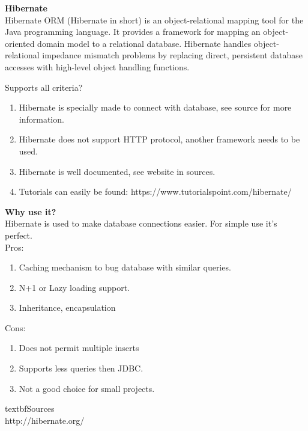 		\textbf{Hibernate} \\
		Hibernate ORM (Hibernate in short) is an object-relational mapping tool for the Java programming language. It provides a framework for mapping an object-oriented domain model to a relational database. Hibernate handles object-relational impedance mismatch problems by replacing direct, persistent database accesses with high-level object handling functions.
		
		Supports all criteria?\\
		\begin{enumerate}
			\item Hibernate is specially made to connect with database, see source for more information.
			\item Hibernate does not support HTTP protocol, another framework needs to be used.
			\item Hibernate is well documented, see website in sources.
			\item Tutorials can easily be found: https://www.tutorialspoint.com/hibernate/
		\end{enumerate}
		
		\textbf{Why use it?} \\
		Hibernate is used to make database connections easier. For simple use it's perfect.\\
		
		Pros:
		\begin{enumerate}
		\item Caching mechanism to bug database with similar queries.
		\item N+1 or Lazy loading support.
		\item Inheritance, encapsulation
		\end{enumerate}
		Cons:
		\begin{enumerate}
		\item Does not permit multiple inserts
		\item Supports less queries then JDBC.
		\item Not a good choice for small projects.
		\end{enumerate}
	
	textbf{Sources}\\
	http://hibernate.org/